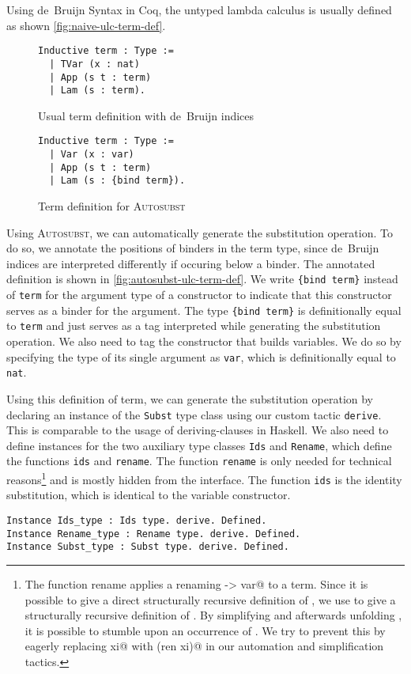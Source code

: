 \documentclass{scrartcl}
\newcommand{\Autosubst}{\textsc{Autosubst}\xspace}
\newcommand{\lst}{\lstinline}
\begin{document}
Using de~Bruijn Syntax in Coq, the untyped lambda calculus is usually defined as shown \autoref{fig:naive-ulc-term-def}.
\begin{figure}
\begin{minipage}{0.45\textwidth}
  \centering
\begin{lstlisting}
Inductive term : Type :=
  | TVar (x : nat)
  | App (s t : term)
  | Lam (s : term).
\end{lstlisting}
  \caption{Usual term definition with de~Bruijn indices}
  \label{fig:naive-ulc-term-def}
\end{minipage}
\hfill
\begin{minipage}{0.45\textwidth} 
  \begin{lstlisting}
Inductive term : Type :=
  | Var (x : var)
  | App (s t : term)
  | Lam (s : {bind term}). 
\end{lstlisting}
\caption{Term definition for \Autosubst}
\label{fig:autosubst-ulc-term-def}
\end{minipage}
\end{figure}
Using \Autosubst, we can automatically generate the substitution operation.
To do so, we annotate the positions of binders in the term type, since de~Bruijn indices are interpreted differently if occuring below a binder. The annotated definition is shown in \autoref{fig:autosubst-ulc-term-def}.
We write \lst${bind term}$ instead of \lst$term$ for the argument type of a constructor to indicate that this constructor serves as a binder for the argument. 
The type \lst${bind term}$ is definitionally equal to \lst$term$ and just serves as a tag interpreted while generating the substitution operation.
We also need to tag the constructor that builds variables. We do so by specifying the type of its single argument as \lst$var$, which is definitionally equal to \lst$nat$.

Using this definition of term, we can generate the substitution operation \lst@subst@ by declaring an instance of the \lst$Subst$ type class using our custom tactic \lst$derive$. This is comparable to the usage of deriving-clauses in Haskell.
We also need to define instances for the two auxiliary type classes \lst$Ids$ and \lst$Rename$, which define the functions \lst$ids$ and \lst$rename$. 
The function \lst$rename$ is only needed for technical reasons\footnote{The function rename applies a renaming \lst@var -> var@ to a term. Since it is possible to give a direct structurally recursive definition of \lst@rename@, we use \lst@rename@ to give a structurally recursive definition of \lst@subst@. By simplifying \lst@subst@ and afterwards unfolding \lst@up@, it is possible to stumble upon an occurrence of \lst@rename@. We try to prevent this by eagerly replacing \lst@rename xi@ with \lst@subst (ren xi)@ in our automation and simplification tactics.} and is mostly hidden from the interface.
The function \lst$ids$ is the identity substitution, which is identical to the variable constructor.
\begin{lstlisting}
Instance Ids_type : Ids type. derive. Defined.
Instance Rename_type : Rename type. derive. Defined.
Instance Subst_type : Subst type. derive. Defined.
\end{lstlisting}
\end{document}

